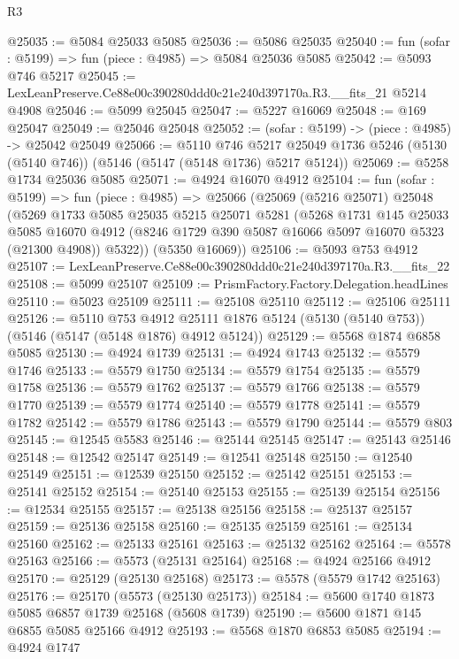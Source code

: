 \begin{lexlean}{R3}
\begin{coremodule}
@25035 := @5084 @25033 @5085
@25036 := @5086 @25035
@25040 := fun (sofar : @5199) => fun (piece : @4985) => @5084 @25036 @5085
@25042 := @5093 @746 @5217
@25045 := LexLeanPreserve.Ce88e00c390280ddd0c21e240d397170a.R3.__fits_21 @5214 @4908
@25046 := @5099 @25045
@25047 := @5227 @16069
@25048 := @169 @25047
@25049 := @25046 @25048
@25052 := (sofar : @5199) -> (piece : @4985) -> @25042 @25049
@25066 := @5110
    @746
    @5217
    @25049
    @1736
    @5246
    (@5130 (@5140 @746))
    (@5146 (@5147 (@5148 @1736) @5217 @5124))
@25069 := @5258 @1734 @25036 @5085
@25071 := @4924 @16070 @4912
@25104 := fun (sofar : @5199) =>
  fun (piece : @4985) =>
  @25066
    (@25069
      (@5216 @25071)
      @25048
      (@5269
        @1733
        @5085
        @25035
        @5215
        @25071
        @5281
        (@5268
          @1731
          @145
          @25033
          @5085
          @16070
          @4912
          (@8246 @1729 @390 @5087 @16066 @5097 @16070 @5323 (@21300 @4908))
          @5322))
      (@5350 @16069))
@25106 := @5093 @753 @4912
@25107 := LexLeanPreserve.Ce88e00c390280ddd0c21e240d397170a.R3.__fits_22
@25108 := @5099 @25107
@25109 := PrismFactory.Factory.Delegation.headLines
@25110 := @5023 @25109
@25111 := @25108 @25110
@25112 := @25106 @25111
@25126 := @5110
    @753
    @4912
    @25111
    @1876
    @5124
    (@5130 (@5140 @753))
    (@5146 (@5147 (@5148 @1876) @4912 @5124))
@25129 := @5568 @1874 @6858 @5085
@25130 := @4924 @1739
@25131 := @4924 @1743
@25132 := @5579 @1746
@25133 := @5579 @1750
@25134 := @5579 @1754
@25135 := @5579 @1758
@25136 := @5579 @1762
@25137 := @5579 @1766
@25138 := @5579 @1770
@25139 := @5579 @1774
@25140 := @5579 @1778
@25141 := @5579 @1782
@25142 := @5579 @1786
@25143 := @5579 @1790
@25144 := @5579 @803
@25145 := @12545 @5583
@25146 := @25144 @25145
@25147 := @25143 @25146
@25148 := @12542 @25147
@25149 := @12541 @25148
@25150 := @12540 @25149
@25151 := @12539 @25150
@25152 := @25142 @25151
@25153 := @25141 @25152
@25154 := @25140 @25153
@25155 := @25139 @25154
@25156 := @12534 @25155
@25157 := @25138 @25156
@25158 := @25137 @25157
@25159 := @25136 @25158
@25160 := @25135 @25159
@25161 := @25134 @25160
@25162 := @25133 @25161
@25163 := @25132 @25162
@25164 := @5578 @25163
@25166 := @5573 (@25131 @25164)
@25168 := @4924 @25166 @4912
@25170 := @25129 (@25130 @25168)
@25173 := @5578 (@5579 @1742 @25163)
@25176 := @25170 (@5573 (@25130 @25173))
@25184 := @5600 @1740 @1873 @5085 @6857 @1739 @25168 (@5608 @1739)
@25190 := @5600 @1871 @145 @6855 @5085 @25166 @4912
@25193 := @5568 @1870 @6853 @5085
@25194 := @4924 @1747

\end{coremodule}
\end{lexlean}
